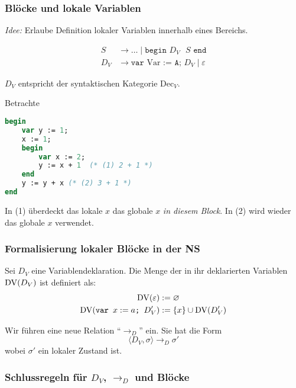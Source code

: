 \subsubsection{Blöcke und lokale Variablen}

\emph{Idee:} Erlaube Definition lokaler Variablen innerhalb eines Bereichs.

\begin{align*}
    S & \to \dots \;\vert\; \texttt{begin $D_V$ $S$ end} \\
    D_V & \to \texttt{var} \text{ Var } \texttt{:= A; $D_V$} \;\vert\; \varepsilon
\end{align*}

$D_V$ entspricht der syntaktischen Kategorie Dec$_V$.

\begin{example}
Betrachte
\begin{lstlisting}[language=Pascal]
begin
    var y := 1;
    x := 1;
    begin
        var x := 2;
        y := x + 1  (* (1) 2 + 1 *)
    end
    y := y + x (* (2) 3 + 1 *)
end
\end{lstlisting}

In (1) überdeckt das lokale $x$ das globale $x$ \emph{in diesem Block}. In (2) wird wieder das globale $x$ verwendet.
\end{example}



\subsubsection{Formalisierung lokaler Blöcke in der NS}

\begin{definition}
    Sei $D_V$ eine Variablendeklaration. Die Menge der in ihr deklarierten Variablen $\operatorname{DV}(D_V)$ ist definiert als:
    \begin{align*}
        \operatorname{DV}(\varepsilon) & := \varnothing \\
        \operatorname{DV}(\texttt{var } x := a \texttt{; } D_V') & := \{ x \} \cup \operatorname{DV}(D_V')
    \end{align*}

    Wir führen eine neue Relation ``$\to_D$'' ein. Sie hat die Form \[
        \langle D_V, \sigma \rangle \to_D \sigma'
    \]
    wobei $\sigma'$ ein lokaler Zustand ist.
\end{definition}



\subsubsection{Schlussregeln für $D_V$, $\to_D$ und Blöcke}

